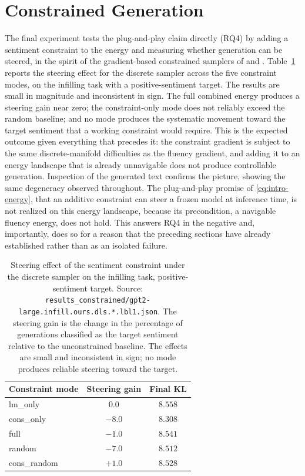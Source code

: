 \section{Constrained Generation}
\label{sec:results-constrained}

The final experiment tests the plug-and-play claim directly (RQ4) by adding a sentiment constraint to the energy and measuring whether generation can be steered, in the spirit of the gradient-based constrained samplers of \citet{kumar2022gradient} and \citet{qin2022cold}. Table~\ref{tab:constrained} reports the steering effect for the discrete sampler across the five constraint modes, on the infilling task with a positive-sentiment target.
The results are small in magnitude and inconsistent in sign. The full combined energy produces a steering gain near zero; the constraint-only mode does not reliably exceed the random baseline; and no mode produces the systematic movement toward the target sentiment that a working constraint would require. This is the expected outcome given everything that precedes it: the constraint gradient is subject to the same discrete-manifold difficulties as the fluency gradient, and adding it to an energy landscape that is already unnavigable does not produce controllable generation. Inspection of the generated text confirms the picture, showing the same degeneracy observed throughout. The plug-and-play promise of \eqref{eq:intro-energy}, that an additive constraint can steer a frozen model at inference time, is not realized on this energy landscape, because its precondition, a navigable fluency energy, does not hold. This answers RQ4 in the negative and, importantly, does so for a reason that the preceding sections have already established rather than as an isolated failure.

\begin{table}[t]
    \centering
    \small
    \begin{tabular}{lcc}
        \toprule
        Constraint mode & Steering gain & Final KL \\
        \midrule
        lm\_only & $0.0$ & $8.558$ \\
        cons\_only & $-8.0$ & $8.308$ \\
        full & $-1.0$ & $8.541$ \\
        random & $-7.0$ & $8.512$ \\
        cons\_random & $+1.0$ & $8.528$ \\
        \bottomrule
    \end{tabular}
    \caption{Steering effect of the sentiment constraint under the discrete sampler on the infilling task, positive-sentiment target. Source: \texttt{results\_constrained/gpt2-large.infill.ours.dls.*.lbl1.json}. The steering gain is the change in the percentage of generations classified as the target sentiment relative to the unconstrained baseline. The effects are small and inconsistent in sign; no mode produces reliable steering toward the target.}
    \label{tab:constrained}
\end{table}
